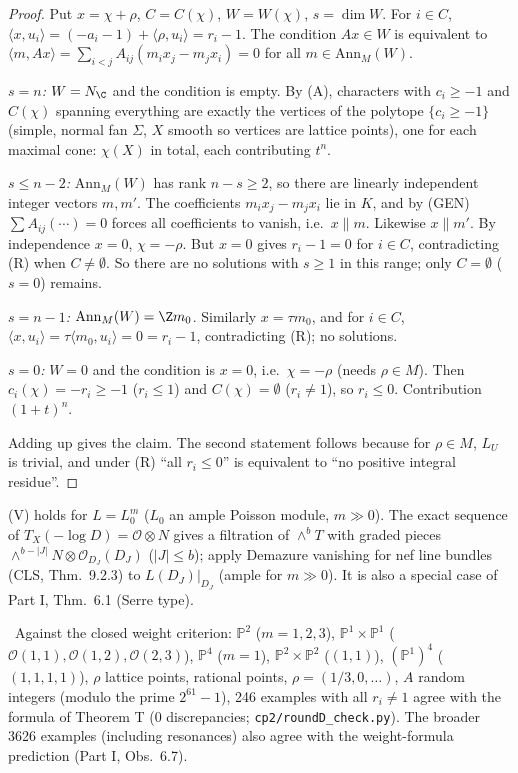 \begin{proof}
Put $x=\chi+\rho$, $C=C(\chi)$, $W=W(\chi)$, $s=\dim W$. For $i\in C$, $\langle x,u_i\rangle=(-a_i-1)+\langle\rho,u_i\rangle=r_i-1$. The condition $Ax\in W$ is equivalent to $\langle m,Ax\rangle=\sum_{i<j}A_{ij}(m_ix_j-m_jx_i)=0$ for all $m\in\mathrm{Ann}_M(W)$.

\emph{$s=n$:} $W=N_\C$ and the condition is empty. By (A), characters with $c_i\ge-1$ and $C(\chi)$ spanning everything are exactly the vertices of the polytope $\{c_i\ge-1\}$ (simple, normal fan $\Sigma$, $X$ smooth so vertices are lattice points), one for each maximal cone: $\chi(X)$ in total, each contributing $t^n$.

\emph{$s\le n-2$:} $\mathrm{Ann}_M(W)$ has rank $n-s\ge2$, so there are linearly independent integer vectors $m,m'$. The coefficients $m_ix_j-m_jx_i$ lie in $K$, and by (GEN) $\sum A_{ij}(\cdots)=0$ forces all coefficients to vanish, i.e.\ $x\parallel m$. Likewise $x\parallel m'$. By independence $x=0$, $\chi=-\rho$. But $x=0$ gives $r_i-1=0$ for $i\in C$, contradicting (R) when $C\ne\emptyset$. So there are no solutions with $s\ge1$ in this range; only $C=\emptyset$ ($s=0$) remains.

\emph{$s=n-1$:} $\mathrm{Ann}_M(W)=\Z m_0$. Similarly $x=\tau m_0$, and for $i\in C$, $\langle x,u_i\rangle=\tau\langle m_0,u_i\rangle=0=r_i-1$, contradicting (R); no solutions.

\emph{$s=0$:} $W=0$ and the condition is $x=0$, i.e.\ $\chi=-\rho$ (needs $\rho\in M$). Then $c_i(\chi)=-r_i\ge-1$ ($r_i\le1$) and $C(\chi)=\emptyset$ ($r_i\ne1$), so $r_i\le0$. Contribution $(1+t)^n$.

Adding up gives the claim. The second statement follows because for $\rho\in M$, $L_U$ is trivial, and under (R) ``all $r_i\le0$'' is equivalent to ``no positive integral residue''.\qedhere
\end{proof}
\begin{rem}[On (V)\ \tC]
(V) holds for $L=L_0^m$ ($L_0$ an ample Poisson module, $m\gg0$). The exact sequence of $T_X(-\log D)=\mathcal O\otimes N$ gives a filtration of $\wedge^bT$ with graded pieces $\wedge^{b-|J|}N\otimes\mathcal O_{D_J}(D_J)$ ($|J|\le b$); apply Demazure vanishing for nef line bundles (CLS, Thm.\ 9.2.3\tQ) to $L(D_J)|_{D_J}$ (ample for $m\gg0$). It is also a special case of Part I, Thm.\ 6.1 (Serre type).
\end{rem}
\tV\ Against the closed weight criterion: $\mathbb{P}^2$ ($m=1,2,3$), $\mathbb{P}^1\times\mathbb{P}^1$ ($\mathcal O(1,1),\mathcal O(1,2),\mathcal O(2,3)$), $\mathbb{P}^4$ ($m=1$), $\mathbb{P}^2\times\mathbb{P}^2$ ($(1,1)$), $(\mathbb{P}^1)^4$ ($(1,1,1,1)$), $\rho$ lattice points, rational points, $\rho=(1/3,0,\dots)$, $A$ random integers (modulo the prime $2^{61}-1$), 246 examples with all $r_i\ne1$ agree with the formula of Theorem T (0 discrepancies; \texttt{cp2/roundD\_check.py}). The broader 3626 examples (including resonances) also agree with the weight-formula prediction (Part I, Obs.\ 6.7).

